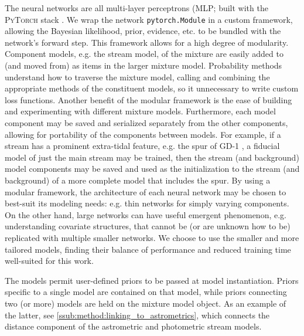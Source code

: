 \documentclass[twocolumn]{aastex631}
\newcommand{\code}[1]{\textsc{#1}}
\newcommand{\package}[1]{\code{#1}}
\newcommand{\stream}[1]{#1}
\begin{document}
        The neural networks are all multi-layer perceptrons (MLP; built with the
        \package{PyTorch} stack \citep{Pytorch2019}. We wrap the network
        \texttt{pytorch.Module} in a custom framework, allowing the Bayesian
        likelihood, prior, evidence, etc. to be bundled with the network's
        forward step. This framework allows for a high degree of modularity.
        Component models, e.g. the stream model, of the mixture are easily added
        to (and moved from) as items in the larger mixture model. Probability
        methods understand how to traverse the mixture model, calling and
        combining the appropriate methods of the constituent models, so it
        unnecessary to write custom loss functions.  Another benefit of the
        modular framework is the ease of building and experimenting with
        different mixture models. Furthermore, each model component may be saved
        and serialized separately from the other components, allowing for
        portability of the components between models.  For example, if a stream
        has a prominent extra-tidal feature, e.g. the spur of \stream{GD-1}
        \citep{Bonaca+2019}, a fiducial model of just the main stream may be
        trained, then the stream (and background) model components may be saved
        and used as the initialization to the stream (and background) of a more
        complete model that includes the spur.  By using a modular framework,
        the architecture of each neural network may be chosen to best-suit its
        modeling needs: e.g. thin networks for simply varying components.  On
        the other hand, large networks can have useful emergent phenomenon, e.g.
        understanding covariate structures, that cannot be (or are unknown how
        to be) replicated with multiple smaller networks. We choose to use the
        smaller and more tailored models, finding their balance of performance
        and reduced training time well-suited for this work.

        The models permit user-defined priors to be passed at model
        instantiation.  Priors specific to a single model are contained on that
        model, while priors connecting two (or more) models are held on the
        mixture model object. As an example of the latter, see
        \autoref{ssub:method:linking_to_astrometrics}, which connects the
        distance component of the astrometric and photometric stream models.
\end{document}
